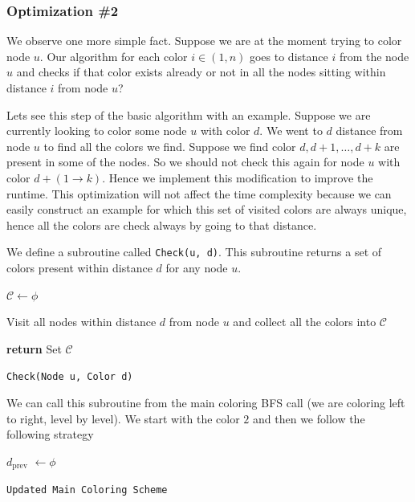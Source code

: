 \documentclass{article}
\theoremstyle{remark}
\begin{document}
\subsubsection{Optimization \#2}
We observe one more simple fact. Suppose we are at the moment trying to color node $u$. Our algorithm for each color $i \in (1, n)$ goes to distance $i$ from the node $u$ and checks if that color exists already or not in all the nodes sitting within distance $i$ from node $u$?

Lets see this step of the basic algorithm with an example. Suppose we are currently looking to color some node $u$ with color $d$. We went to $d$ distance from node $u$ to find all the colors we find. Suppose we find color $d, d + 1, \dots, d+k$ are present in some of the nodes. So we should not check this again for node $u$ with color $d + (1 \to k)$. Hence we implement this modification to improve the runtime. This optimization will not affect the time complexity because we can easily construct an example for which this set of visited colors are always unique, hence all the colors are check always by going to that distance.

We define a subroutine called \texttt{Check(u, d)}. This subroutine returns a set of colors present within distance $d$ for any node $u$.

\begin{algorithm}[H]\label{alg:1}
    $\mathcal{C} \gets \phi$\;

    Visit all nodes within distance $d$ from node $u$ and collect all the colors into $\mathcal{C}$\;

    \textbf{return} Set $\mathcal{C}$\;
    
    \caption{\texttt{Check(Node u, Color d)}}
\end{algorithm}

We can call this subroutine from the main coloring BFS call (we are coloring left to right, level by level). We start with the color $2$ and then we follow the following strategy

\begin{algorithm}[H]
     {
        $d_{\text{prev}}$ $\gets \phi$\;
         {


        }
    }
    \caption{\texttt{Updated Main Coloring Scheme}}
\end{algorithm}
\end{document}
